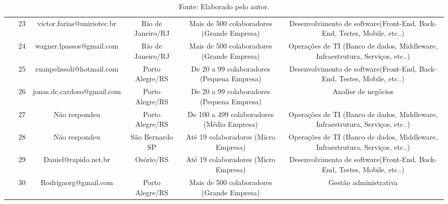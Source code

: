 \documentclass[twoside,english,brazilian]{UNISINOSartigo}
\newcommand{\source}[1]{\caption*{Fonte: {#1}} }
\begin{document}
\begin{table}[h]
\begin{tabularx}{\columnwidth}{cccccc}
~ & 23 & victor.farias@uniriotec.br & Rio de Janeiro/RJ & Mais de 500 colaboradores (Grande Empresa) & Desenvolvimento de software(Front-End, Back-End, Testes, Mobile, etc..) \\
~ & 24 & wagner.lpassos@gmail.com & Rio de Janeiro/RJ & Mais de 500 colaboradores (Grande Empresa) & Operações de TI (Banco de dados, Middleware, Infraestrutura, Serviços, etc..) \\
~ & 25 & ruanpelissoli@hotmail.com & Porto Alegre/RS & De 20 a 99 colaboradores (Pequena Empresa) & Desenvolvimento de software(Front-End, Back-End, Testes, Mobile, etc..) \\
~ & 26 & jonas.dc.cardoso@gmail.com & Porto Alegre/RS & De 20 a 99 colaboradores (Pequena Empresa) & Analise de negócios \\
~ & 27 & Não respondeu & Porto Alegre/RS & De 100 a 499 colaboradores (Média Empresa) & Operações de TI (Banco de dados, Middleware, Infraestrutura, Serviços, etc..) \\
~ & 28 & Não respondeu & São Bernardo SP & Até 19 colaboradores (Micro Empresa) & Operações de TI (Banco de dados, Middleware, Infraestrutura, Serviços, etc..) \\
~ & 29 & Daniel@rapido.net.br  & Osório/RS  & Até 19 colaboradores (Micro Empresa) & Desenvolvimento de software(Front-End, Back-End, Testes, Mobile, etc..) \\
~ & 30 & Rodrigaorg@gmail.com & Porto Alegre/RS & Mais de 500 colaboradores (Grande Empresa) & Gestão administrativa \\ 
\hline
    \end{tabularx}
    \source{Elaborado pelo autor.}
\end{table}
\end{document}
